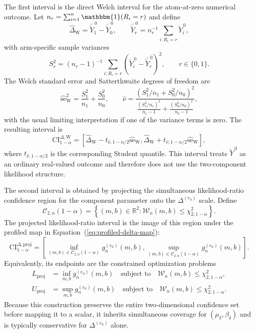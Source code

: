 \documentclass[11pt]{article}
\begin{document}
The first interval is the direct Welch interval for the atom-at-zero numerical outcome. Let $n_r=\sum_{i=1}^n\mathbbm{1}(R_i=r)$ and define
\[
  \widehat{\Delta}_{\mathrm{W}}
  =
  \bar{\widetilde{Y}}^{\,0}_1-\bar{\widetilde{Y}}^{\,0}_0,
  \qquad
  \bar{\widetilde{Y}}^{\,0}_r
  =
  n_r^{-1}\sum_{i:R_i=r}\widetilde{Y}_i^{\,0},
\]
with arm-specific sample variances
\[
  S_r^2
  =
  (n_r-1)^{-1}\sum_{i:R_i=r}
  \left(\widetilde{Y}_i^{\,0}-\bar{\widetilde{Y}}^{\,0}_r\right)^2,
  \qquad r\in\{0,1\}.
\]
The Welch standard error and Satterthwaite degrees of freedom are
\[
  \widehat{\mathrm{se}}_{\mathrm{W}}^2
  =
  \frac{S_1^2}{n_1}+\frac{S_0^2}{n_0},
  \qquad
  \widehat{\nu}
  =
  \frac{
    \left(S_1^2/n_1+S_0^2/n_0\right)^2
  }{
    \frac{(S_1^2/n_1)^2}{n_1-1}
    +
    \frac{(S_0^2/n_0)^2}{n_0-1}
  },
\]
with the usual limiting interpretation if one of the variance terms is zero. The resulting interval is
\begin{equation}
  \mathrm{CI}^{\Delta,\mathrm{W}}_{1-\alpha}
  =
  \left[
    \widehat{\Delta}_{\mathrm{W}}
    -
    t_{\widehat{\nu},1-\alpha/2}\widehat{\mathrm{se}}_{\mathrm{W}},
    \widehat{\Delta}_{\mathrm{W}}
    +
    t_{\widehat{\nu},1-\alpha/2}\widehat{\mathrm{se}}_{\mathrm{W}}
  \right],
  \label{eq:welch-delta-ci}
\end{equation}
where $t_{\widehat{\nu},1-\alpha/2}$ is the corresponding Student quantile. This interval treats $\widetilde{Y}^{\,0}$ as an ordinary real-valued outcome and therefore does not use the two-component likelihood structure.

The second interval is obtained by projecting the simultaneous likelihood-ratio confidence region for the component parameter onto the $\Delta^{(e_0)}$ scale. Define
\begin{equation}
  \mathcal{C}_{2,n}(1-\alpha)
  =
  \left\{
    (m,b)\in\mathbb{R}^2:
    \mathcal{W}_n(m,b)\leq\chi^2_{2,1-\alpha}
  \right\}.
  \label{eq:component-simultaneous-region}
\end{equation}
The projected likelihood-ratio interval is the image of this region under the profiled map in Equation~(\ref{eq:profiled-delta-map}):
\begin{equation}
  \mathrm{CI}^{\Delta,\mathrm{proj}}_{1-\alpha}
  =
  \left[
    \inf_{(m,b)\in\mathcal{C}_{2,n}(1-\alpha)}
    g_n^{(e_0)}(m,b),
    \sup_{(m,b)\in\mathcal{C}_{2,n}(1-\alpha)}
    g_n^{(e_0)}(m,b)
  \right].
  \label{eq:projected-delta-ci}
\end{equation}
Equivalently, its endpoints are the constrained optimization problems
\begin{align}
  L_{\mathrm{proj}}
  &=
  \inf_{m,b}
  g_n^{(e_0)}(m,b)
  \quad
  \text{subject to}
  \quad
  \mathcal{W}_n(m,b)\leq\chi^2_{2,1-\alpha},
  \label{eq:projected-delta-lower}\\
  U_{\mathrm{proj}}
  &=
  \sup_{m,b}
  g_n^{(e_0)}(m,b)
  \quad
  \text{subject to}
  \quad
  \mathcal{W}_n(m,b)\leq\chi^2_{2,1-\alpha}.
  \label{eq:projected-delta-upper}
\end{align}
Because this construction preserves the entire two-dimensional confidence set before mapping it to a scalar, it inherits simultaneous coverage for $(\mu_\delta,\beta_\delta)$ and is typically conservative for $\Delta^{(e_0)}$ alone.
\end{document}
